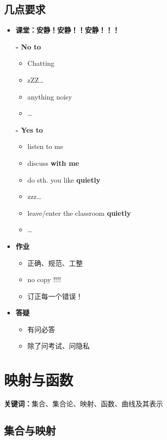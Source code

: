 \section{几点要求}
\begin{itemize}
	\item {\bf 课堂：安静！安静！！安静！！！}
	
	{\bf - No to}
	  \begin{itemize}
	    \item Chatting
	    \item zZZ\ldots
	    \item anything noisy
	    \item \ldots
	  \end{itemize}
	{\bf - Yes to}
  \begin{itemize}
    \item listen to me
    \item discuss {\bf with me}
    \item do sth. you like {\bf quietly}
    \item zzz\ldots
    \item leave/enter the classroom {\bf quietly}
    \item \ldots
  \end{itemize}
  \item {\bf 作业}
  \begin{itemize}
    \item 正确、规范、工整
    \item no copy !!!!
    \item 订正每一个错误！
  \end{itemize}
	\item {\bf 答疑}
	  \begin{itemize}
	    \item 有问必答
	    \item 除了问考试、问隐私
	  \end{itemize}
\end{itemize}

\chapter{映射与函数}

{\bf 关键词：}集合、集合论、映射、函数、曲线及其表示

\section{集合与映射}

